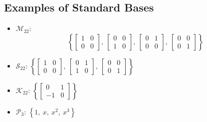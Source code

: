 \documentclass{article}
\begin{document}
\begin{multicols*}{3}
    \subsection{Examples of Standard Bases}
    \begin{itemize}[leftmargin=*,itemsep=-1ex,partopsep=1ex,parsep=1ex]
        \item \(\mathscr{M}_{22}\):
              \begin{equation*}
                  \left\{ \begin{bmatrix*}
                      1 & 0 \\
                      0 & 0
                  \end{bmatrix*},\: \begin{bmatrix*}
                      0 & 0 \\
                      1 & 0
                  \end{bmatrix*},\: \begin{bmatrix*}
                      0 & 1 \\
                      0 & 0
                  \end{bmatrix*},\: \begin{bmatrix*}
                      0 & 0 \\
                      0 & 1
                  \end{bmatrix*} \right\}
              \end{equation*}
        \item \(\mathscr{S}_{22}\): \(\left\{ \begin{bmatrix*}
                  1 & 0 \\
                  0 & 0
              \end{bmatrix*},\: \begin{bmatrix*}
                  0 & 1 \\
                  1 & 0
              \end{bmatrix*},\: \begin{bmatrix*}
                  0 & 0 \\
                  0 & 1
              \end{bmatrix*} \right\}\)
        \item \(\mathscr{K}_{22}\): \(\left\{ \begin{bmatrix*}
                  0 & 1 \\
                  -1 & 0
              \end{bmatrix*}\right\}\)
        \item \(\mathscr{P}_3\): \(\left\{ 1,\: x,\: x^2,\: x^3 \right\}\)
    \end{itemize}

\end{multicols*}
\end{document}
